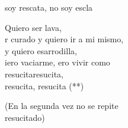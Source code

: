 \begin{cancion}[Resucitados][]
	soy rescata, no soy escla \jump\\
	\begin{chorus}%
		Quiero  ser lava, \\
		r curado y quiero ir a mi mismo, \\
		y quiero esarrodilla, \\
		iero vaciarme, ero vivir como\\
		resucitaresucita, \\
		resucita, resucita (**) \jump\\
	\end{chorus}%
(En la segunda vez no se repite\\
resucitado)\\
\end{cancion}%
